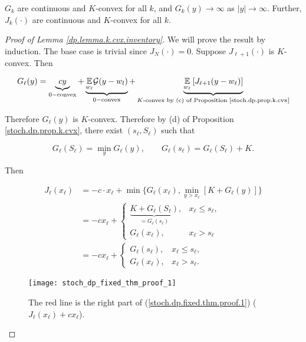 \begin{lemma}\label{dp.lemma.k.cvx.inventory}

\(G_k\) are continuous and \(K\)-convex for all \(k\), and \(G_k(y) \to \infty\) as \(|y| \to \infty\). Further, \(J_k(\cdot)\) are continuous and \(K\)-convex for all \(k\). 

\end{lemma}








 
 
 
 \begin{proof}[Proof of Lemma \ref{dp.lemma.k.cvx.inventory}]

 We will prove the result by induction. The base case is trivial since \(J_N(\cdot) = 0\). Suppose \(J_{\ell+1}(\cdot)\) is \(K\)-convex. Then

\[
G_\ell(y) = \underbrace{cy}_{0-\text{convex}} +  \underbrace{\underset{w_\ell}{\mathbb{E}} \mathcal{G}(y - w_l) }_{0-\text{convex}} + \underbrace{\underset{w_\ell}{\mathbb{E}} \left[ J_{\ell+1}(y - w_\ell) \right]}_{K\text{-convex by (c) of Proposition \ref{stoch.dp.prop.k.cvx}}}
\]

Therefore \(G_\ell(y)\) is \(K\)-convex. Therefore by (d) of Proposition \ref{stoch.dp.prop.k.cvx}, there exist \((s_\ell, S_\ell)\) such that 

\[
G_\ell(S_\ell) = \min_y G_\ell(y) , \qquad G_\ell(s_\ell) = G_\ell(S_\ell) + K.
\]

Then

\begin{align}
J_\ell(x_\ell) & = -c \cdot x_\ell + \min\{ G_\ell (x_\ell), \min_{y > x_\ell} [K + G_\ell(y) ] \} \nonumber \\
& = -c x_\ell + \begin{cases}
\underbrace{K + G_\ell(S_\ell)}_{=G_\ell(s_\ell)}, & x_\ell \leq s_\ell, \\
G_\ell(x_\ell), &  x_\ell > s_\ell
\end{cases} \nonumber 
\\
& = -c x_\ell + \begin{cases}
G_\ell(s_\ell), & x_\ell \leq s_\ell, \\
G_\ell(x_\ell), &  x_\ell > s_\ell. \label{stoch.dp.fixed.thm.proof.1}
\end{cases}
\end{align}



\begin{figure}[htbp]
\begin{center}
\texttt{[image: stoch\_dp\_fixed\_thm\_proof\_1]}
\caption{The red line is the right part of (\ref{stoch.dp.fixed.thm.proof.1}) (\(J_\ell(x_\ell) + c x_\ell\)).}
\label{stoch_dp_fixed_thm_proof_1}
\end{center}
\end{figure}


\end{proof}
